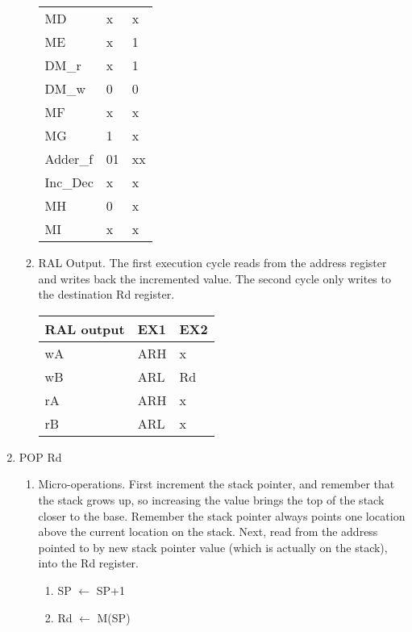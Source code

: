 \documentclass[12pt,letterpaper]{article}
\begin{document}
\begin{enumerate}
\begin{enumerate}
\begin{tabular}{l l l}
                 MD & x & x \\
                 ME & x & 1 \\
                 DM\_r & x & 1 \\
                 DM\_w & 0 & 0 \\
                 MF & x & x \\
                 MG & 1 & x \\
                 Adder\_f & 01 & xx \\
                 Inc\_Dec & x & x \\
                 MH & 0 & x \\
                 MI & x & x \\
            \end{tabular}

        \item RAL Output. The first execution cycle reads from the address register and writes back the incremented value. The second cycle only writes to the destination Rd register.\\
            \begin{tabular}{l l l}
                 RAL output & EX1 & EX2 \\
                 \hline
                 wA & ARH & x  \\
                 wB & ARL & Rd\\
                 rA & ARH & x \\
                 rB & ARL & x \\
            \end{tabular}
    \end{enumerate}


    \item POP Rd
    \begin{enumerate}
        \item Micro-operations. First increment the stack pointer, and remember that the stack grows up, so increasing the value brings the top of the stack closer to the base. Remember the stack pointer always points one location above the current location on the stack. Next, read from the address pointed to by new stack pointer value (which is actually on the stack), into the Rd register.\\
            \begin{enumerate}[i]
                \item SP $\leftarrow$ SP+1
                \item Rd $\leftarrow$ M(SP)
            \end{enumerate}


\end{enumerate}
\end{enumerate}
\end{document}
